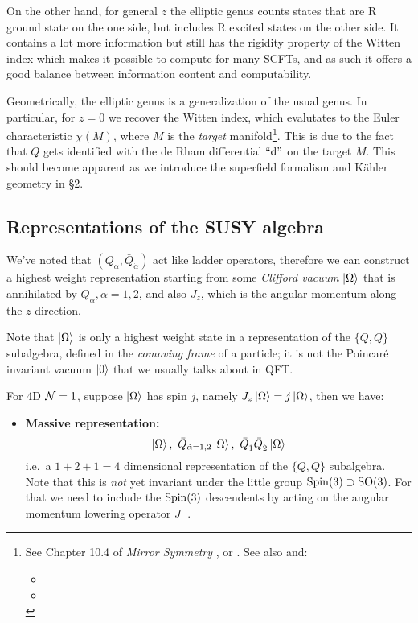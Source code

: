 \documentclass[a4paper
	,10pt
]{article}
\begin{document}
	On the other hand, for general $z$ the elliptic genus counts states that are R ground state on the one side, but includes R excited states on the other side. 
	It contains a lot more information but still has the rigidity property of the Witten index which makes it possible to compute for many SCFTs, and as such it offers a good balance between information content and computability. 
	
	Geometrically, the elliptic genus is a generalization of the usual genus. In particular, for $z = 0$ we recover the Witten index, which evalutates to the Euler characteristic $\chi(M)$, where $M$ is the \textit{target} manifold\footnote{
		See Chapter 10.4 of \textit{Mirror Symmetry} \cite{Hori:2003ic}, or \textcite{Witten:1982df}. See also \cite{MauricioStuff} and:
		\begin{itemize}[
			topsep=.5ex,noitemsep,
			leftmargin=4em
		]
		\item {}
		\item {}
		\end{itemize}
		\vspace{-.8\baselineskip}
	}. This is due to the fact that $Q$ gets identified with the de Rham differential $\text{``$\dd$''}$ on the target $M$. This should become apparent as we introduce the superfield formalism and K\"ahler geometry in \S2. 
	
\subsection{Representations of the SUSY algebra}
	We've noted that $(Q_\alpha, \bar{Q}_{\dot{\alpha}})$ act like ladder operators, therefore we can construct a highest weight representation starting from some \textit{Clifford vacuum} $\ket{\Omega}$ that is annihilated by $Q_\alpha,\alpha = 1,2$, and also $J_z$, which is the angular momentum along the $z$ direction. 
	
	Note that $\ket{\Omega}$ is only a highest weight state in a representation of the $\{Q,Q\}$ subalgebra, defined in the \textit{comoving frame} of a particle; it is not the Poincar\'e invariant vacuum $\ket{0}$ that we usually talks about in QFT. 
	
	For 4D $\mathcal{N} = 1$, suppose $\ket{\Omega}$ has spin $j$, namely $J_z \ket{\Omega} = j\ket{\Omega}$, then we have:
	\begin{itemize}[leftmargin=0pt,itemindent=*]
	\item \textbf{Massive representation:}
		\begin{equation}
			\ket{\Omega},
			\ \bar{Q}_{\dot{\alpha}=1,2}
				\ket{\Omega},
			\ \bar{Q}_{\dot{1}}\bar{Q}_{\dot{2}}
				\ket{\Omega}
		\end{equation}
		i.e.~a $1+2+1 = 4$ dimensional representation of the $\{Q,Q\}$ subalgebra. 
		Note that this is \textit{not} yet invariant under the little group $\mathrm{Spin}(3) \supset \mathrm{SO}(3)$. For that we need to include the $\mathrm{Spin}(3)$ descendents by acting on the angular momentum lowering operator $J_-$. 
	\end{itemize}
	
\end{document}
